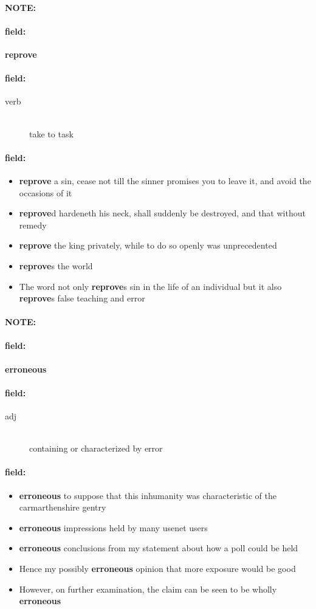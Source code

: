 \documentclass[12pt]{article}
\newenvironment{note}{\paragraph{NOTE:}}{}
\newenvironment{field}{\paragraph{field:}}{}
\begin{document}
\begin{note}
\begin{field}
\textbf{\large reprove}
\end{field}


\begin{field}
\begin{description}
\item[verb] \hfill \\ 
take to task

\end{description}
\end{field}

\begin{field}
\begin{itemize}
\item \textbf{reprove} a sin, cease not till the sinner promises you to leave it, and avoid the occasions of it
\item \textbf{reprove}d hardeneth his neck, shall suddenly be destroyed, and that without remedy
\item \textbf{reprove} the king privately, while to do so openly was unprecedented
\item \textbf{reprove}s the world
\item The word not only \textbf{reprove}s sin in the life of an individual but it also \textbf{reprove}s false teaching and error
\end{itemize}
\end{field}
\end{note}
\begin{note}
\begin{field}
\textbf{\large erroneous}
\end{field}


\begin{field}
\begin{description}
\item[adj] \hfill \\ 
containing or characterized by error

\end{description}
\end{field}

\begin{field}
\begin{itemize}
\item \textbf{erroneous} to suppose that this inhumanity was characteristic of the carmarthenshire gentry
\item \textbf{erroneous} impressions held by many usenet users
\item \textbf{erroneous} conclusions from my statement about how a poll could be held
\item Hence my possibly \textbf{erroneous} opinion that more exposure would be good
\item However, on further examination, the claim can be seen to be wholly \textbf{erroneous}
\end{itemize}
\end{field}
\end{note}
\end{document}
